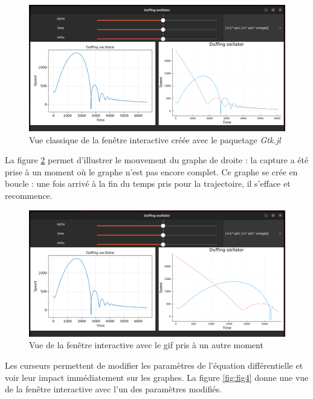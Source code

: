 \documentclass[a4paper, french, 12pt, titlepage]{article}
\begin{document}
\begin{figure}[H]
  \begin{center}
    \includegraphics[width=\linewidth]{interactivewindow_1.png}
  \end{center}

  \caption{Vue classique de la fenêtre interactive créée avec le paquetage \emph{Gtk.jl}}
  \label{fig:interactive1}
\end{figure}


La figure \ref{fig:fig3} permet d'illustrer le mouvement du graphe de droite : la capture a été prise à un moment où le graphe n'est pas encore complet.
Ce graphe se crée en boucle : une fois arrivé à la fin du temps pris pour la trajectoire, il s'efface et recommence. 

\begin{figure}[htb]
  \includegraphics[width=\linewidth]{interactivewindow_2.png}
  \caption{Vue de la fenêtre interactive avec le gif pris à un autre moment}
  \label{fig:fig3}
\end{figure}


Les curseurs permettent de modifier les paramètres de l'équation différentielle et voir leur impact immédiatement sur les graphes.
La figure \ref{fig:fig4} donne une vue de la fenêtre interactive avec l'un des paramètres modifiés. 
\end{document}
